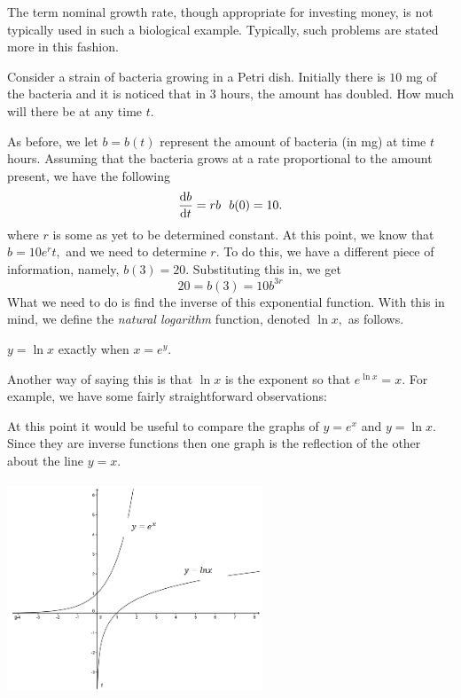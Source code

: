 The term nominal growth rate, though appropriate for investing money,
is not typically used in such a biological example.  Typically, such
problems are stated more in this fashion.



\begin{myexample}
  Consider a strain of bacteria growing in a Petri dish.  Initially
  there is $10$ mg of the bacteria and it is noticed that in $3$ hours,
  the amount has doubled.  How much will there be at any time $t.$ 

   As before, we let $b=b(t)$
  represent the amount of bacteria (in mg) at time $t$ hours.  Assuming
  that the bacteria grows at a rate proportional to the amount
  present, we have the following
$$
\frac{\text{d}{b}}{\text{d}{t}}=rb\ \ b(0)=10.
$$
where $r$ is some as yet to be determined constant.  At this point, we
know that $b=10e^rt,$ and we need to determine $r.$  To do this, we have
a different piece of information, namely, $b(3)=20.$  Substituting this
in, we get
$$
20=b(3)=10b^{3r}
$$
What we need to do is find the inverse of this exponential function.
With this in mind, we define the \emph{natural logarithm} function, denoted
$\ln x,$ as follows.
\centerline{$y=\ln x$ exactly when  $x=e^y.$}

Another way of saying this is that $\ln x$ is the exponent so that
$e^{\ln x}=x.$
For example, we have some fairly straightforward observations:

At this point it would be useful to compare the graphs of $y=e^x$ and
$y=\ln x.$  Since they are inverse functions then one graph is the
reflection of the other about the line $y=x.$ 
\centerline{ \includegraphics*[height=2.5in,width=3in]{Figures/LogAndExp}}
\end{myexample}

